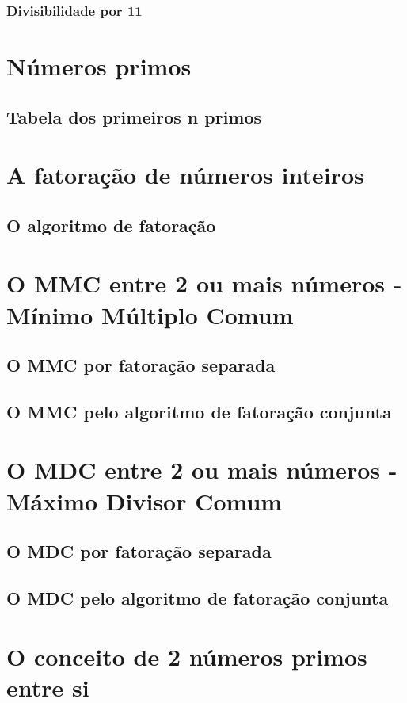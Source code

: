 \subsubsection{Divisibilidade por 11}

\section{Números primos}

\subsection{Tabela dos primeiros n primos}

\section{A fatoração de números inteiros}

\subsection{O algoritmo de fatoração}

\section{O MMC entre 2 ou mais números - Mínimo Múltiplo Comum}

\subsection{O MMC por fatoração separada}

\subsection{O MMC pelo algoritmo de fatoração conjunta}

\section{O MDC entre 2 ou mais números - Máximo Divisor Comum}

\subsection{O MDC por fatoração separada}

\subsection{O MDC pelo algoritmo de fatoração conjunta}

\section{O conceito de 2 números primos entre si}

